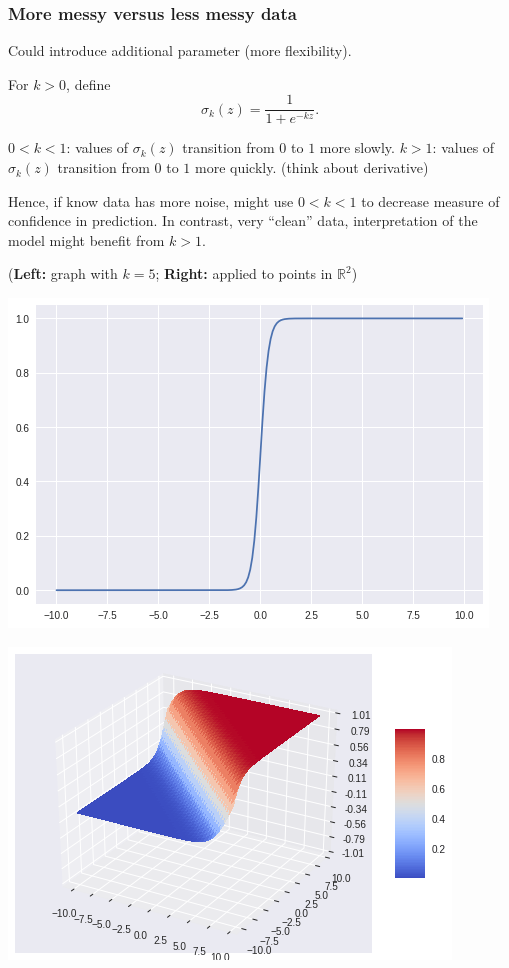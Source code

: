 \documentclass{beamer}
\theoremstyle{example}
\begin{document}
\begin{frame}
    \frametitle{More messy versus less messy data}
    Could introduce additional parameter (more flexibility).

    For $k > 0$, define \[\sigma_k(z) = \frac{1}{1+e^{-kz}}.\]

    \pause
    $0 < k < 1$: values of $\sigma_k(z)$ transition from $0$ to $1$ more slowly.\newline 
    $k > 1$: values of $\sigma_k(z)$ transition from $0$ to $1$ more quickly. (think about derivative)

    \pause
    Hence, if know data has more noise, might use $0 < k < 1$ to decrease measure of confidence in prediction. In contrast, very ``clean'' data, interpretation of the model might benefit from $k>1$.
    
    \pause
    (\textbf{Left:} graph with $k=5$; \textbf{Right:} applied to points in $\mathbb R^2$)
    \centering
    \begin{multicols}{2}
    \includegraphics[height=0.25\textheight]{../../Images/logistic_function_kis5.png}

    \includegraphics[height=0.25\textheight]{../../Images/logistic_function_appliedtohalfspace.png}
    \end{multicols}
    
\end{frame}
\end{document}
